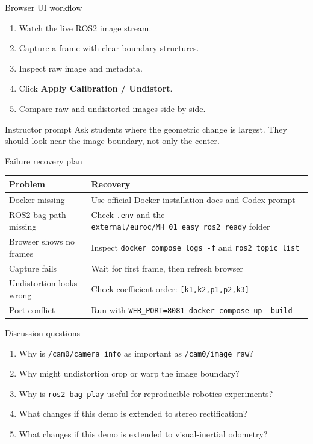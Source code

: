 \documentclass[aspectratio=169,10pt]{beamer}
\newcommand{\code}[1]{\texttt{#1}}
\begin{document}
\begin{frame}{Browser UI workflow}
  \begin{enumerate}
    \item Watch the live ROS2 image stream.
    \item Capture a frame with clear boundary structures.
    \item Inspect raw image and metadata.
    \item Click \textbf{Apply Calibration / Undistort}.
    \item Compare raw and undistorted images side by side.
  \end{enumerate}
  \vspace{0.8em}
  \begin{block}{Instructor prompt}
    Ask students where the geometric change is largest. They should look near the image boundary, not only the center.
  \end{block}
\end{frame}

\begin{frame}{Failure recovery plan}
  \begin{tabularx}{\textwidth}{@{}l X@{}}
    \toprule
    Problem & Recovery \\
    \midrule
    Docker missing & Use official Docker installation docs and Codex prompt \\
    ROS2 bag path missing & Check \code{.env} and the \code{external/euroc/MH\_01\_easy\_ros2\_ready} folder \\
    Browser shows no frames & Inspect \code{docker compose logs -f} and \code{ros2 topic list} \\
    Capture fails & Wait for first frame, then refresh browser \\
    Undistortion looks wrong & Check coefficient order: \code{[k1,k2,p1,p2,k3]} \\
    Port conflict & Run with \code{WEB\_PORT=8081 docker compose up --build} \\
    \bottomrule
  \end{tabularx}
\end{frame}

\begin{frame}{Discussion questions}
  \begin{enumerate}
    \item Why is \code{/cam0/camera\_info} as important as \code{/cam0/image\_raw}?
    \item Why might undistortion crop or warp the image boundary?
    \item Why is \code{ros2 bag play} useful for reproducible robotics experiments?
    \item What changes if this demo is extended to stereo rectification?
    \item What changes if this demo is extended to visual-inertial odometry?
  \end{enumerate}
\end{frame}
\end{document}
